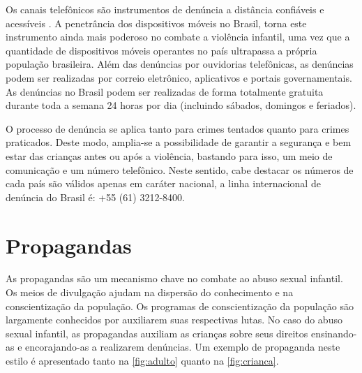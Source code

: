 Os canais telefônicos são instrumentos de denúncia a distância confiáveis e acessíveis \cite{linhas2017}. A penetrância dos dispositivos móveis no Brasil, torna este instrumento ainda mais poderoso no combate a violência infantil, uma vez que a quantidade de dispositivos móveis operantes no país ultrapassa a própria população brasileira. Além das denúncias por ouvidorias telefônicas, as denúncias podem ser realizadas por correio eletrônico, aplicativos e portais governamentais. As denúncias no Brasil podem ser realizadas de forma totalmente gratuita durante toda a semana 24 horas por dia (incluindo sábados, domingos e feriados).

O processo de denúncia se aplica tanto para crimes tentados quanto para crimes praticados. Deste modo, amplia-se a possibilidade de garantir a segurança e bem estar das crianças antes ou após a violência, bastando para isso, um meio de comunicação e um número telefônico. Neste sentido, cabe destacar os números de cada país são válidos apenas em caráter nacional, a linha internacional de denúncia do Brasil é: +55 (61) 3212-8400.






\section{Propagandas}\label{sec:propagandas}

As propagandas são um mecanismo chave no combate ao abuso sexual infantil. Os meios de divulgação ajudam na dispersão do conhecimento e na conscientização da população. Os programas de conscientização da população são largamente conhecidos por auxiliarem suas respectivas lutas. %
No caso do abuso sexual infantil, as propagandas auxiliam as crianças sobre seus direitos ensinando-as e encorajando-as a realizarem denúncias. Um exemplo de propaganda neste estilo é apresentado tanto na \autoref{fig:adulto} quanto na \autoref{fig:crianca}.

